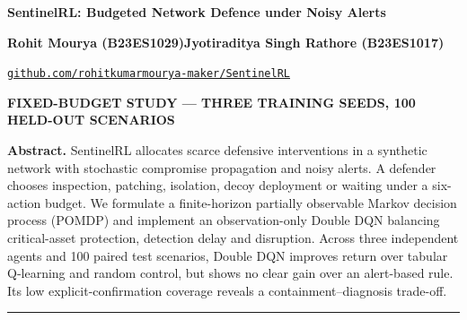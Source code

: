 \documentclass[10pt,a4paper]{article}
\begin{document}
\begin{center}
{\Large\bfseries SentinelRL: Budgeted Network Defence under Noisy Alerts}\par\vspace{4pt}
{\small\textbf{Rohit Mourya (B23ES1029)}\quad\textbf{Jyotiraditya Singh Rathore (B23ES1017)}}\par
{\small\href{https://github.com/rohitkumarmourya-maker/SentinelRL}{\texttt{github.com/rohitkumarmourya-maker/SentinelRL}}}\par\vspace{4pt}
{\small\color{ink}\textbf{FIXED-BUDGET STUDY --- THREE TRAINING SEEDS, 100 HELD-OUT SCENARIOS}}
\end{center}
\vspace{-2pt}
\small\textbf{Abstract.} SentinelRL allocates scarce defensive interventions in a synthetic network with stochastic compromise propagation and noisy alerts. A defender chooses inspection, patching, isolation, decoy deployment or waiting under a six-action budget. We formulate a finite-horizon partially observable Markov decision process (POMDP) and implement an observation-only Double DQN balancing critical-asset protection, detection delay and disruption. Across three independent agents and 100 paired test scenarios, Double DQN improves return over tabular Q-learning and random control, but shows no clear gain over an alert-based rule. Its low explicit-confirmation coverage reveals a containment--diagnosis trade-off.
\vspace{4pt}\hrule\vspace{4pt}
\end{document}
